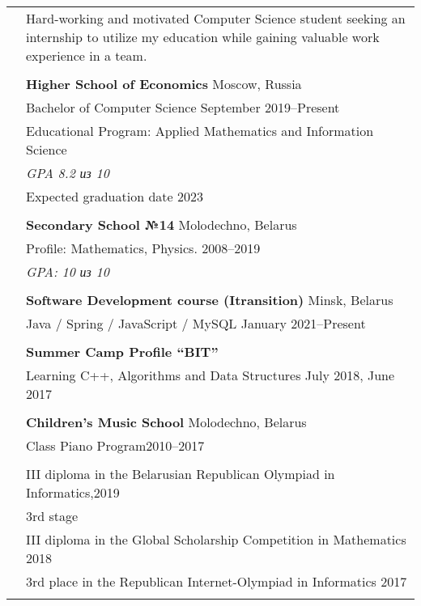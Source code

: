 \documentclass[letterpaper, 11pt]{article}
\begin{document}
\begin{longtable}{p{1.3in}p{4.8in}}


\nohyphens{\color{OliveGreen}{Objective}}
& Hard-working and motivated Computer Science student seeking an internship to utilize my
education while gaining valuable work experience in a team. \\
& \\


\color{OliveGreen}{Education} 
& \textbf{Higher School of Economics} \hfill Moscow, Russia \\ 
& Bachelor of Computer Science \hfill September 2019--Present \\
& Educational Program: Applied Mathematics and Information Science\\
& {\it GPA 8.2 из 10}\\
& Expected graduation date 2023\\
& \\

& \textbf{Secondary School №14} \hfill Molodechno, Belarus \\
& Profile: Mathematics, Physics. \hfill 2008--2019\\
& {\it GPA: 10 из 10}\\
& \\



{\color{OliveGreen}{Additional}}
& \textbf{Software Development course (Itransition)} \hfill Minsk, Belarus\\
{\color{OliveGreen}{Education}} 
& Java / Spring / JavaScript / MySQL \hfill January 2021--Present\\
& \\

& \textbf{Summer Camp Profile “BIT”} \\
& Learning C++, Algorithms and Data Structures \hfill July 2018, June 2017 \\
& \\

& \textbf{Children’s Music School} \hfill Molodechno, Belarus\\
& Class Piano Program\hfill 2010--2017\\
& \\


{\color{OliveGreen}{Aware and}} 
& III diploma in the Belarusian Republican Olympiad in Informatics,\hfill 2019\\
{\color{OliveGreen}{achievements}} 
& 3rd stage \\
& III diploma in the Global Scholarship Competition in Mathematics \hfill 2018\\
& 3rd place in the Republican Internet-Olympiad in Informatics  \hfill 2017\\
& \\


\end{longtable}
\end{document}
